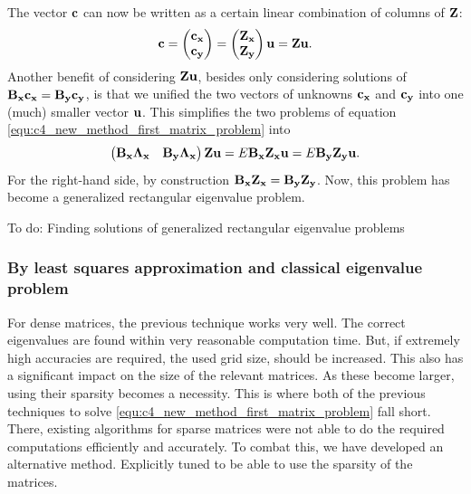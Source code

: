 The vector $\vb{c}$ can now be written as a certain linear combination of columns of $\vb{Z}$:
$$
    \vb{c} = \begin{pmatrix}\vb{c_x} \\ \vb{c_y} \end{pmatrix} = \begin{pmatrix} \vb{Z_x} \\ \vb{Z_y} \end{pmatrix}  \vb{u} = \vb{Z} \vb{u} \text{.}
$$
Another benefit of considering $\vb{Z}\vb{u}$, besides only considering solutions of $\vb{B_x} \vb{c_x} = \vb{B_y} \vb{c_y}$, is that we unified the two vectors of unknowns $\vb{c_x}$ and $\vb{c_y}$ into one (much) smaller vector $\vb{u}$. This simplifies the two problems of equation \eqref{equ:c4_new_method_first_matrix_problem} into
$$
    \begin{pmatrix}
        \vb{B_x}\vb{\Lambda_x} & \vb{B_y}\vb{\Lambda_x}
    \end{pmatrix} \vb{Z} \vb{u} = E \vb{B_x} \vb{Z_x} \vb{u} = E \vb{B_y} \vb{Z_y} \vb{u} \text{.}
$$
For the right-hand side, by construction $\vb{B_x} \vb{Z_x} = \vb{B_y} \vb{Z_y}$. Now, this problem has become a generalized rectangular eigenvalue problem.

    {\color{red}To do: Finding solutions of generalized rectangular eigenvalue problems}

\subsubsection{By least squares approximation and classical eigenvalue problem}

For dense matrices, the previous technique works very well. The correct eigenvalues are found within very reasonable computation time. But, if extremely high accuracies are required, the used grid size, should be increased. This also has a significant impact on the size of the relevant matrices. As these become larger, using their sparsity becomes a necessity. This is where both of the previous techniques to solve \eqref{equ:c4_new_method_first_matrix_problem} fall short. There, existing algorithms for sparse matrices were not able to do the required computations efficiently and accurately. To combat this, we have developed an alternative method. Explicitly tuned to be able to use the sparsity of the matrices.

